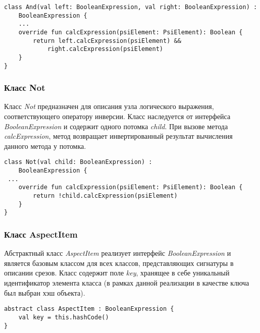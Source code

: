 \begin{lstlisting}[style={java}, label={lst:And},
  caption={Класс And}]
class And(val left: BooleanExpression, val right: BooleanExpression) :
	BooleanExpression {
	...
    override fun calcExpression(psiElement: PsiElement): Boolean {
        return left.calcExpression(psiElement) &&
        	right.calcExpression(psiElement)
    }
}
\end{lstlisting}
\subsubsection{Класс Not}
\label{ssub:Not}
Класс \textit{Not} предназначен для описания узла логического выражения,
соответствующего оператору инверсии.
Класс наследуется от интерфейса \textit{BooleanExpression} и содержит одного
потомка \textit{child}.
При вызове метода \textit{calcExpression}, метод возвращает инвертированный
результат вычисления данного метода у потомка.

\begin{lstlisting}[style={java}, label={lst:Not},
  caption={Класс Not}]
class Not(val child: BooleanExpression) :
	BooleanExpression {
 ...
    override fun calcExpression(psiElement: PsiElement): Boolean {
        return !child.calcExpression(psiElement)
    }
}
\end{lstlisting}
\subsubsection{Класс AspectItem}
\label{ssub:AspectItem}
Абстрактный класс \textit{AspectItem} реализует интерфейс
\textit{BooleanExpression} и является базовым классом для всех классов,
представляющих сигнатуры в описании срезов.
Класс содержит поле \textit{key}, хранящее в себе уникальный идентификатор
элемента класса (в рамках данной реализации в качестве ключа был выбран хэш
объекта).

\begin{lstlisting}[style={java}, label={lst:AspectItem},
  caption={Класс AspectItem}]
abstract class AspectItem : BooleanExpression {
    val key = this.hashCode()
}
\end{lstlisting}

